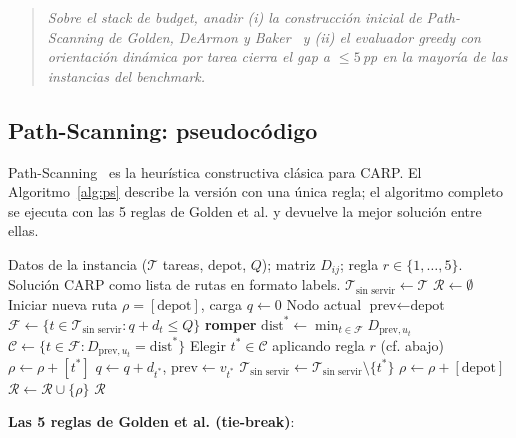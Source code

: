 \documentclass[11pt,a4paper]{article}
\theoremstyle{definition}
\theoremstyle{remark}
\begin{document}
\begin{quote}
\textit{Sobre el stack de budget, anadir (i) la construcción inicial
de Path-Scanning de Golden, DeArmon y Baker~\cite{golden1983} y (ii) el evaluador
greedy con orientación dinámica por tarea cierra el gap a $\le 5$\,pp
en la mayoría de las instancias del benchmark.}
\end{quote}

\subsection{Path-Scanning: pseudocódigo}

Path-Scanning~\cite{golden1983} es la heurística constructiva clásica para CARP. El
Algoritmo~\ref{alg:ps} describe la versión con una única regla; el
algoritmo completo se ejecuta con las 5 reglas de Golden et al. y
devuelve la mejor solución entre ellas.

\begin{algorithm}[h]
\caption{Path-Scanning con regla $r$.}
\label{alg:ps}
\begin{algorithmic}[1]
\Require Datos de la instancia ($\mathcal{T}$ tareas, $\text{depot}$, $Q$);
  matriz $D_{ij}$; regla $r \in \{1, \dots, 5\}$.
\Ensure Solución CARP como lista de rutas en formato labels.
\State $\mathcal{T}_{\text{sin servir}} \gets \mathcal{T}$
\State $\mathcal{R} \gets \emptyset$
  \State Iniciar nueva ruta $\rho = [\text{depot}]$, carga $q \gets 0$
  \State Nodo actual $\text{prev} \gets \text{depot}$
    \State $\mathcal{F} \gets \{ t \in \mathcal{T}_{\text{sin servir}} : q + d_t \le Q \}$
     \textbf{romper} \EndIf
    \State $\mathrm{dist}^* \gets \min_{t \in \mathcal{F}} D_{\text{prev}, u_t}$
    \State $\mathcal{C} \gets \{ t \in \mathcal{F} : D_{\text{prev}, u_t} = \mathrm{dist}^* \}$
    \State Elegir $t^* \in \mathcal{C}$ aplicando regla $r$ (cf. abajo)
    \State $\rho \gets \rho + [t^*]$
    \State $q \gets q + d_{t^*}$, $\text{prev} \gets v_{t^*}$
    \State $\mathcal{T}_{\text{sin servir}} \gets \mathcal{T}_{\text{sin servir}} \setminus \{t^*\}$
  \EndWhile
  \State $\rho \gets \rho + [\text{depot}]$
  \State $\mathcal{R} \gets \mathcal{R} \cup \{\rho\}$
\EndWhile
\State \Return $\mathcal{R}$
\end{algorithmic}
\end{algorithm}

\textbf{Las 5 reglas de Golden et al. (tie-break)}:
\end{document}

